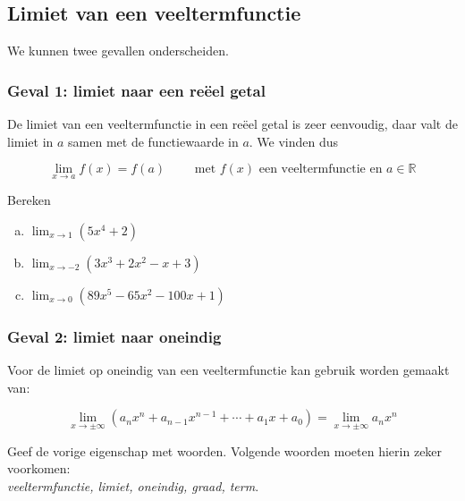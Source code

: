\documentclass[12pt,twoside,a4paper]{article}
\newenvironment{eigenschap}
{
  \vspace{0.4cm}
  \begin{mdframed}[nobreak=true,frametitle={Eigenschap}]
  }{%
  \end{mdframed}
}
\begin{document}
\needspace{4cm}
\subsection{Limiet van een veeltermfunctie}

We kunnen twee gevallen onderscheiden.

\subsubsection*{Geval 1: limiet naar een reëel getal}

De limiet van een veeltermfunctie in een reëel getal is zeer eenvoudig, daar valt de limiet in $a$ samen met de functiewaarde in $a$. We vinden dus

\begin{eigenschap}
  $$\lim_{x\to a}f(x)=f(a) \qquad \mbox{ met $f(x)$ een veeltermfunctie en $a\in\mathbb{R}$}$$
\end{eigenschap}

\begin{oefening}
  Bereken
  \begin{enumerate}[(a)]
  \itemsep.5em
  \item $\displaystyle\lim_{x\to1}\left(5x^4+2\right)$
  \item $\displaystyle\lim_{x\to-2}\left(3x^3+2x^2-x+3\right)$
  \item $\displaystyle\lim_{x\to0}\left(89x^5-65x^2-100x+1\right)$
  \end{enumerate}
\end{oefening}

\subsubsection*{Geval 2: limiet naar oneindig}

Voor de limiet op oneindig van een veeltermfunctie kan gebruik worden gemaakt van:

\begin{eigenschap}
  $$\lim_{x\to\pm\infty}\left(a_nx^n+a_{n-1}x^{n-1}+\cdots+a_1x+a_0\right) = \lim_{x\to\pm\infty}a_nx^n$$
\end{eigenschap}

\begin{oefening}
  Geef de vorige eigenschap met woorden. Volgende woorden moeten hierin zeker voorkomen:\\
  {\em veeltermfunctie, limiet, oneindig, graad, term}.
\end{oefening}
\end{document}
